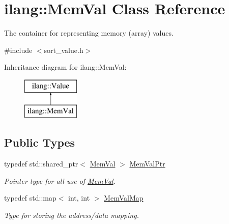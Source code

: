 \hypertarget{classilang_1_1_mem_val}{}\section{ilang\+:\+:Mem\+Val Class Reference}
\label{classilang_1_1_mem_val}


The container for representing memory (array) values.  




{\ttfamily \#include $<$sort\+\_\+value.\+h$>$}

Inheritance diagram for ilang\+:\+:Mem\+Val\+:\begin{figure}[H]
\begin{center}
\leavevmode
\includegraphics[height=2.000000cm]{classilang_1_1_mem_val}
\end{center}
\end{figure}
\subsection*{Public Types}
\begin{DoxyCompactItemize}
\item 
\mbox{\label{classilang_1_1_mem_val_a9a2bf21ab1aa0d15fcb9024025a1487e}} 
typedef std\+::shared\+\_\+ptr$<$ \mbox{\hyperlink{classilang_1_1_mem_val}{Mem\+Val}} $>$ \mbox{\hyperlink{classilang_1_1_mem_val_a9a2bf21ab1aa0d15fcb9024025a1487e}{Mem\+Val\+Ptr}}
\begin{DoxyCompactList}\small\item\em Pointer type for all use of \mbox{\hyperlink{classilang_1_1_mem_val}{Mem\+Val}}. \end{DoxyCompactList}\item 
\mbox{\label{classilang_1_1_mem_val_aea3cddbc760f2e143d02cdfab66e6b36}} 
typedef std\+::map$<$ int, int $>$ \mbox{\hyperlink{classilang_1_1_mem_val_aea3cddbc760f2e143d02cdfab66e6b36}{Mem\+Val\+Map}}
\begin{DoxyCompactList}\small\item\em Type for storing the address/data mapping. \end{DoxyCompactList}\end{DoxyCompactItemize}
